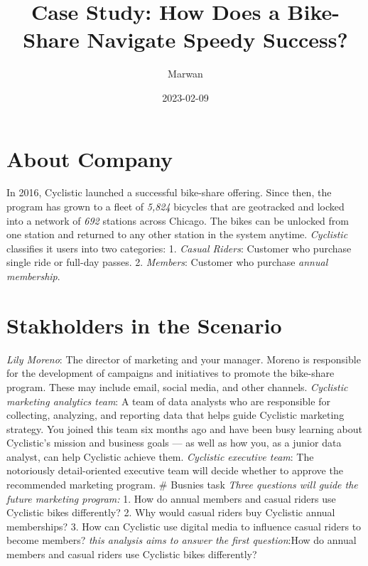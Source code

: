 \documentclass[
]{article}
\title{Case Study: How Does a Bike-Share Navigate Speedy Success?}
\author{Marwan}
\date{2023-02-09}
\begin{document}
\maketitle

\hypertarget{about-company}{%
\section{About Company}\label{about-company}}

In 2016, Cyclistic launched a successful bike-share offering. Since
then, the program has grown to a fleet of \emph{5,824} bicycles that are
geotracked and locked into a network of \emph{692} stations across
Chicago. The bikes can be unlocked from one station and returned to any
other station in the system anytime. \emph{Cyclistic} classifies it
users into two categories: 1. \emph{Casual Riders}: Customer who
purchase single ride or full-day passes. 2. \emph{Members}: Customer who
purchase \emph{annual membership}.

\hypertarget{stakholders-in-the-scenario}{%
\section{Stakholders in the
Scenario}\label{stakholders-in-the-scenario}}

\emph{Lily Moreno}: The director of marketing and your manager. Moreno
is responsible for the development of campaigns and initiatives to
promote the bike-share program. These may include email, social media,
and other channels. \emph{Cyclistic marketing analytics team}: A team of
data analysts who are responsible for collecting, analyzing, and
reporting data that helps guide Cyclistic marketing strategy. You joined
this team six months ago and have been busy learning about Cyclistic's
mission and business goals --- as well as how you, as a junior data
analyst, can help Cyclistic achieve them. \emph{Cyclistic executive
team}: The notoriously detail-oriented executive team will decide
whether to approve the recommended marketing program. \# Busnies task
\emph{Three questions will guide the future marketing program:} 1. How
do annual members and casual riders use Cyclistic bikes differently? 2.
Why would casual riders buy Cyclistic annual memberships? 3. How can
Cyclistic use digital media to influence casual riders to become
members? \emph{this analysis aims to answer the first question}:How do
annual members and casual riders use Cyclistic bikes differently?
\end{document}
